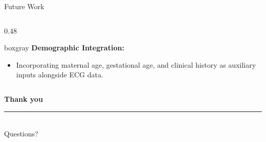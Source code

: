 \documentclass[10pt,aspectratio=169]{beamer}
\newcommand{\Raleway}{\sffamily}
\newcommand{\Lato}{\sffamily}
\begin{document}
\begin{frame}{Future Work}
\begin{columns}[T, onlytextwidth]
\begin{column}{0.48\textwidth}
      \vspace{0.5em}
      
      \begin{beamercolorbox}[wd=\textwidth,rounded=true,leftskip=0.6em,rightskip=0.6em,topskip=0.5em,bottomskip=0.5em]{boxgray}
        \color{coolgray}
        \textbf{Demographic Integration:}
        \begin{itemize}
          \item Incorporating maternal age, gestational age, and clinical history as auxiliary inputs alongside ECG data.
        \end{itemize}
      \end{beamercolorbox}
    \end{column}

  \end{columns}
\end{frame}



{%
  \begin{frame}
    \vfill
    \centering
    {\Raleway\bfseries\Huge\color{white} Thank you}\\[0.6em]
    {\color{aggiegold}\rule{4cm}{0.06cm}}\\[0.8em]
    {\Lato\large\color{white} Questions?}
    \vfill
  \end{frame}
}
\end{document}
